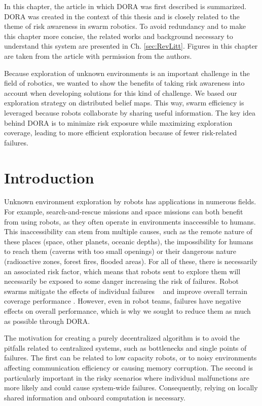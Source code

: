 \label{sec:Theme2}

In this chapter, the article in which \ac{DORA} was first described \cite{vielfaure2021dora} is summarized. \ac{DORA} was created in the context of this thesis and is closely related to the theme of risk awareness in swarm robotics. To avoid redundancy and to make this chapter more concise, the related works and background necessary to understand this system are presented in Ch. \ref{sec:RevLitt}. Figures in this chapter are taken from the article with permission from the authors.

Because exploration of unknown environments is an important challenge in the
field of robotics, we wanted to show the benefits of taking risk awareness into account when developing solutions for this kind of challenge. We based our exploration strategy on distributed belief maps. This way, swarm efficiency is leveraged because robots collaborate by sharing useful information. The key idea behind \ac{DORA} is to minimize risk exposure while maximizing exploration coverage, leading to more efficient exploration because of fewer risk-related failures. 


\section{Introduction}
Unknown environment exploration by robots has applications in numerous fields. For example, search-and-rescue missions \cite{matos2016multiple} and space missions \cite{fong2005interaction} can both benefit from using robots, as they often operate in environments inaccessible to humans. This inaccessibility can stem from multiple causes, such as the remote nature of these places (space, other planets, oceanic depths), the impossibility for humans to reach them (caverns with too small openings) or their dangerous nature (radioactive zones, forest fires, flooded areas). For all of these, there is necessarily an associated risk factor, which means that robots sent to explore them will necessarily be exposed to some danger increasing the risk of failures. Robot swarms mitigate the effects of individual failures ~\cite{ramachandran2019resilience,wehbe2021probabilistic,winfield2006safety} and improve overall terrain coverage performance \cite{burgard2005coordinated}. However, even in robot teams, failures have negative effects on overall performance, which is why we sought to reduce them as much as possible through \ac{DORA}.

The motivation for creating a purely decentralized algorithm is to avoid the pitfalls related to centralized systems, such as bottlenecks and single points of failures. The first can be related to low capacity robots, or to noisy environments affecting communication efficiency or causing memory corruption. The second is particularly important in the risky scenarios where individual malfunctions are more likely and could cause system-wide failures. Consequently, relying on locally shared information and onboard computation is necessary.

